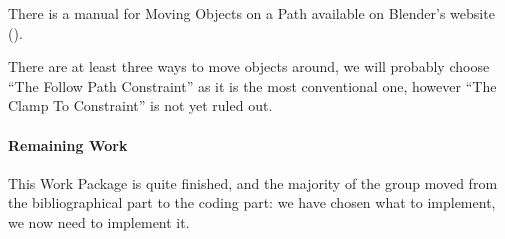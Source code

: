 \par There is a manual for Moving Objects on a Path available on Blender's website (\cite{manual_moving}).

\par There are at least three ways to move objects around, we will probably choose ``The Follow Path Constraint'' as it is the most conventional one, however ``The Clamp To Constraint'' is not yet ruled out.





\paragraph{Remaining Work}
This Work Package is quite finished, and the majority of the group moved from the bibliographical part to the coding part: we have chosen what to implement, we now need to implement it. 
